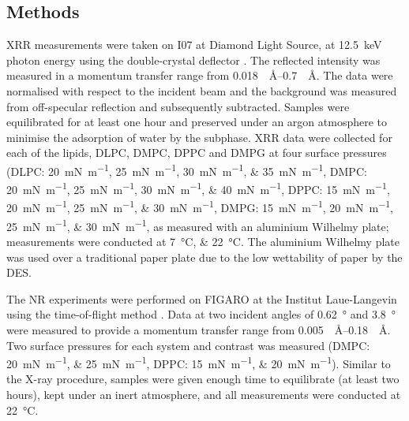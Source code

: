 \documentclass[amsmath,amssymb,twocolumn,superscriptaddress]{revtex4-1}
\begin{document}
\subsection{Methods}
%
XRR measurements were taken on I07 at Diamond Light Source, at \SI{12.5}{\kilo\electronvolt} photon energy using the double-crystal deflector \cite{arnold_implementation_2012}.
The reflected intensity was measured in a momentum transfer range from \SIrange{0.018}{0.7}{\per\angstrom}.
The data were normalised with respect to the incident beam and the background was measured from off-specular reflection and subsequently subtracted.
Samples were equilibrated for at least one hour and preserved under an argon atmosphere to minimise the adsorption of water by the subphase.
XRR data were collected for each of the lipids, DLPC, DMPC, DPPC and DMPG at four surface pressures (DLPC: \SIlist[list-units = single]{20;25;30;35}{\milli\newton\per\meter}, DMPC: \SIlist[list-units = single]{20;25;30;40}{\milli\newton\per\meter}, DPPC: \SIlist[list-units = single]{15;20;25;30}{\milli\newton\per\meter}, DMPG: \SIlist[list-units = single]{15;20;25;30}{\milli\newton\per\meter}, as measured with an aluminium Wilhelmy plate; measurements were conducted at \SIlist{7;22}{\celsius}.
The aluminium Wilhelmy plate was used over a traditional paper plate due to the low wettability of paper by the DES.

The NR experiments were performed on FIGARO at the Institut Laue-Langevin using the time-of-flight method \cite{campbell_figaro_2011}.
Data at two incident angles of \SI{0.62}{\degree} and \SI{3.8}{\degree} were measured to provide a momentum transfer range from \SIrange{0.005}{0.18}{\per\angstrom}.
Two surface pressures for each system and contrast was measured (DMPC: \SIlist[list-units = single]{20;25}{\milli\newton\per\meter}, DPPC: \SIlist[list-units = single]{15;20}{\milli\newton\per\meter}).
Similar to the X-ray procedure, samples were given enough time to equilibrate (at least two hours), kept under an inert atmosphere, and all measurements were conducted at \SI{22}{\celsius}.
\end{document}
